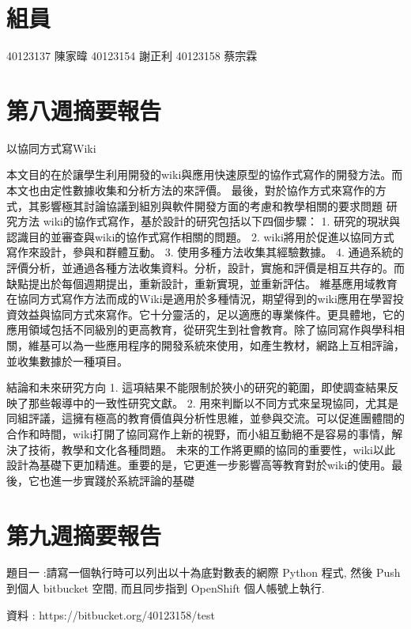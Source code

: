 \documentclass[]{article}
\begin{document}
\section{組員}\label{ux7d44ux54e1-2}

40123137 陳家暐 40123154 謝正利 40123158 蔡宗霖

\section{第八週摘要報告}\label{ux7b2cux516bux9031ux6458ux8981ux5831ux544a}

以協同方式寫Wiki

本文目的在於讓學生利用開發的wiki與應用快速原型的協作式寫作的開發方法。而本文也由定性數據收集和分析方法的來評價。
最後，對於協作方式來寫作的方式，其影響極其討論協議到組別與軟件開發方面的考慮和教學相關的要求問題
研究方法 wiki的協作式寫作，基於設計的研究包括以下四個步驟： 1.
研究的現狀與認識目的並審查與wiki的協作式寫作相關的問題。 2.
wiki將用於促進以協同方式寫作來設計，參與和群體互動。 3.
使用多種方法收集其經驗數據。 4.
通過系統的評價分析，並通過各種方法收集資料。分析，設計，實施和評價是相互共存的。而缺點提出於每個週期提出，重新設計，重新實現，並重新評估。
維基應用域教育在協同方式寫作方法而成的Wiki是適用於多種情況，期望得到的wiki應用在學習投資效益與協同方式來寫作。它十分靈活的，足以適應的專業條件。更具體地，它的應用領域包括不同級別的更高教育，從研究生到社會教育。除了協同寫作與學科相關，維基可以為一些應用程序的開發系統來使用，如產生教材，網路上互相評論，並收集數據於一種項目。

結論和未來研究方向 1.
這項結果不能限制於狹小的研究的範圍，即使調查結果反映了那些報導中的一致性研究文獻。
2.
用來判斷以不同方式來呈現協同，尤其是同組評議，這擁有極高的教育價值與分析性思維，並參與交流。可以促進團體間的合作和時間，wiki打開了協同寫作上新的視野，而小組互動絕不是容易的事情，解決了技術，教學和文化各種問題。
未來的工作將更顯的協同的重要性，wiki以此設計為基礎下更加精進。重要的是，它更進一步影響高等教育對於wiki的使用。最後，它也進一步實踐於系統評論的基礎

\section{第九週摘要報告}\label{ux7b2cux4e5dux9031ux6458ux8981ux5831ux544a}

題目一 :請寫一個執行時可以列出以十為底對數表的網際 Python 程式, 然後
Push 到個人 bitbucket 空間, 而且同步指到 OpenShift 個人帳號上執行.

資料 : https://bitbucket.org/40123158/test
\end{document}
